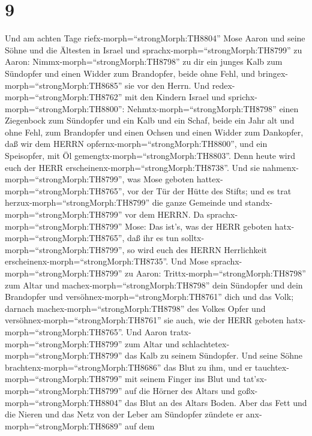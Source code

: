 \hypertarget{section-8}{%
\section{9}\label{section-8}}

 Und am achten Tage riefx-morph=``strongMorph:TH8804'' Mose
Aaron und seine Söhne und die Ältesten in Israel  und
sprachx-morph=``strongMorph:TH8799'' zu Aaron:
Nimmx-morph=``strongMorph:TH8798'' zu dir ein junges Kalb zum Sündopfer
und einen Widder zum Brandopfer, beide ohne Fehl, und
bringex-morph=``strongMorph:TH8685'' sie vor den Herrn.  Und
redex-morph=``strongMorph:TH8762'' mit den Kindern Israel und
sprichx-morph=``strongMorph:TH8800'':
Nehmtx-morph=``strongMorph:TH8798'' einen Ziegenbock zum Sündopfer und
ein Kalb und ein Schaf, beide ein Jahr alt und ohne Fehl, zum Brandopfer
 und einen Ochsen und einen Widder zum Dankopfer, daß wir
dem HERRN opfernx-morph=``strongMorph:TH8800'', und ein Speisopfer, mit
Öl gemengtx-morph=``strongMorph:TH8803''. Denn heute wird euch der HERR
erscheinenx-morph=``strongMorph:TH8738''.  Und sie
nahmenx-morph=``strongMorph:TH8799'', was Mose geboten
hattex-morph=``strongMorph:TH8765'', vor der Tür der Hütte des Stifts;
und es trat herzux-morph=``strongMorph:TH8799'' die ganze Gemeinde und
standx-morph=``strongMorph:TH8799'' vor dem HERRN.  Da
sprachx-morph=``strongMorph:TH8799'' Mose: Das ist's, was der HERR
geboten hatx-morph=``strongMorph:TH8765'', daß ihr es tun
solltx-morph=``strongMorph:TH8799'', so wird euch des HERRN Herrlichkeit
erscheinenx-morph=``strongMorph:TH8735''.  Und Mose
sprachx-morph=``strongMorph:TH8799'' zu Aaron:
Trittx-morph=``strongMorph:TH8798'' zum Altar und
machex-morph=``strongMorph:TH8798'' dein Sündopfer und dein Brandopfer
und versöhnex-morph=``strongMorph:TH8761'' dich und das Volk; darnach
machex-morph=``strongMorph:TH8798'' des Volkes Opfer und
versöhnex-morph=``strongMorph:TH8761'' sie auch, wie der HERR geboten
hatx-morph=``strongMorph:TH8765''.  Und Aaron
tratx-morph=``strongMorph:TH8799'' zum Altar und
schlachtetex-morph=``strongMorph:TH8799'' das Kalb zu seinem Sündopfer.
 Und seine Söhne brachtenx-morph=``strongMorph:TH8686'' das
Blut zu ihm, und er tauchtex-morph=``strongMorph:TH8799'' mit seinem
Finger ins Blut und tat'sx-morph=``strongMorph:TH8799'' auf die Hörner
des Altars und goßx-morph=``strongMorph:TH8804'' das Blut an des Altars
Boden.  Aber das Fett und die Nieren und das Netz von der
Leber am Sündopfer zündete er anx-morph=``strongMorph:TH8689'' auf dem
